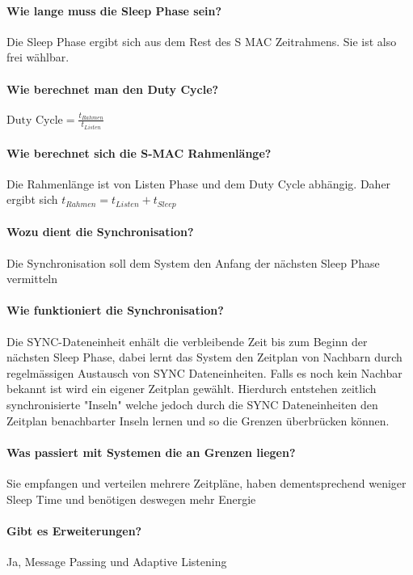 	\paragraph{Wie lange muss die Sleep Phase sein?}
	Die Sleep Phase ergibt sich aus dem Rest des S\- MAC Zeitrahmens. Sie ist also frei wählbar.
	
	\paragraph{Wie berechnet man den Duty Cycle?}
	$\text{Duty Cycle} = \frac{t_{Rahmen}}{t_{Listen}}$
	
	\paragraph{Wie berechnet sich die S-MAC Rahmenlänge?}
	Die Rahmenlänge ist von Listen Phase und dem Duty Cycle abhängig. Daher ergibt sich $t_{Rahmen}=t_{Listen}+t_{Sleep}$
	
	\paragraph{Wozu dient die Synchronisation?}
	Die Synchronisation soll dem System den Anfang der nächsten Sleep Phase vermitteln
	
	\paragraph{Wie funktioniert die Synchronisation?}
	Die SYNC-Dateneinheit enhält die verbleibende Zeit bis zum Beginn der nächsten Sleep Phase, dabei lernt das System den Zeitplan von Nachbarn durch regelmässigen Austausch von SYNC Dateneinheiten. 
	Falls es noch kein Nachbar bekannt ist wird ein eigener Zeitplan gewählt. Hierdurch entstehen zeitlich synchronisierte "Inseln" welche jedoch durch die SYNC Dateneinheiten den Zeitplan benachbarter Inseln lernen und so die Grenzen überbrücken können.
	
	\paragraph{Was passiert mit Systemen die an Grenzen liegen?}
	Sie empfangen und verteilen mehrere Zeitpläne, haben dementsprechend weniger Sleep Time und benötigen deswegen mehr Energie
	
	\paragraph{Gibt es Erweiterungen?}
	Ja, Message Passing und Adaptive Listening
	
